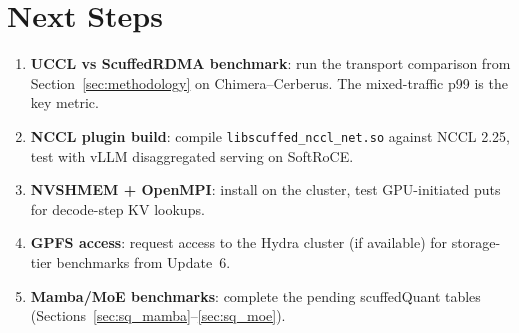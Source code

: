 \documentclass[11pt,letterpaper]{article}
\begin{document}
\section{Next Steps}
\label{sec:next_steps}

\begin{enumerate}
\item \textbf{UCCL vs ScuffedRDMA benchmark}: run the transport comparison from Section~\ref{sec:methodology} on Chimera--Cerberus. The mixed-traffic p99 is the key metric.
\item \textbf{NCCL plugin build}: compile \texttt{libscuffed\_nccl\_net.so} against NCCL 2.25, test with vLLM disaggregated serving on SoftRoCE.
\item \textbf{NVSHMEM + OpenMPI}: install on the cluster, test GPU-initiated puts for decode-step KV lookups.
\item \textbf{GPFS access}: request access to the Hydra cluster (if available) for storage-tier benchmarks from Update~6.
\item \textbf{Mamba/MoE benchmarks}: complete the pending scuffedQuant tables (Sections~\ref{sec:sq_mamba}--\ref{sec:sq_moe}).
\end{enumerate}



\end{document}
